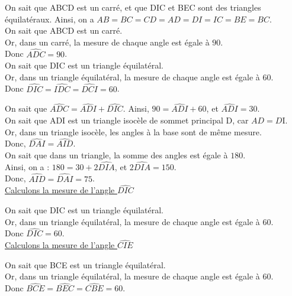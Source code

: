 On sait que ABCD est un carré, et que DIC et BEC sont des triangles équilatéraux. Ainsi, on a $AB = BC = CD = AD = DI = IC = BE = BC$. \\

On sait que ABCD est un carré. \\ Or, dans un carré, la mesure de chaque angle est égale à $90$\degre. \\ Donc $\widehat{ADC} = 90$\degre. \\

On sait que DIC est un triangle équilatéral. \\ Or, dans un triangle équilatéral, la mesure de chaque angle est égale à $60$\degre. \\ Donc $\widehat{DIC} = \widehat{IDC} = \widehat{DCI}= 60$\degre.

On sait que $\widehat{ADC} = \widehat{ADI} + \widehat{DIC}$. 
Ainsi, $90 = \widehat{ADI} + 60$, et $\widehat{ADI} = 30$\degre. \\

On sait que ADI est un triangle isocèle de sommet principal D, car $AD = D$I. \\ Or, dans un triangle isocèle, les angles à la base sont de même mesure. \\ Donc, $\widehat{DAI} = \widehat{AID}$. \\

On sait que dans un triangle, la somme des angles est égale à $180$\degre. \\ Ainsi, on a : $180 = 30 + 2\widehat{DIA}$, et $2\widehat{DIA} = 150$\degre. \\ Donc, $\widehat{AID} = \widehat{DAI} = 75$\degre. \\

\underline{Calculons la mesure de l'angle $\widehat{DIC}$}

On sait que DIC est un triangle équilatéral. \\ Or, dans un triangle équilatéral, la mesure de chaque angle est égale à $60$\degre. \\ Donc $\widehat{DIC} = 60$\degre. \\

\underline{Calculons la mesure de l'angle $\widehat{CIE}$ }

On sait que BCE est un triangle équilatéral. \\ Or, dans un triangle équilatéral, la mesure de chaque angle est égale à $60$\degre. \\ Donc $\widehat{BCE} = \widehat{BEC} = \widehat{CBE} = 60$\degre. \\

